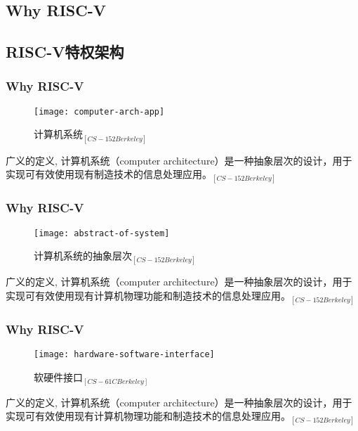 \subsection{Why RISC-V} %
\subsection{RISC-V特权架构}


\begin{frame}
	
	\frametitle{Why RISC-V}
	
	\begin{figure}
		\centering
		\texttt{[image: computer-arch-app]}
		\caption{计算机系统$_{[CS-152 Berkeley]}$}
	\end{figure}
	
	广义的定义, 计算机系统（computer architecture）是一种抽象层次的设计，用于实现可有效使用现有制造技术的信息处理应用。$_{[CS-152 Berkeley]}$
\end{frame}


\begin{frame}
	
	\frametitle{Why RISC-V}
	
	\begin{figure}
		\centering
		\texttt{[image: abstract-of-system]}
		\caption{计算机系统的抽象层次$ _{[CS-152 Berkeley]} $}
	\end{figure}
	
	广义的定义, 计算机系统（computer architecture）是一种抽象层次的设计，用于实现可有效使用现有计算机物理功能和制造技术的信息处理应用。$_{[CS-152 Berkeley]}$
	
\end{frame}


\begin{frame}[plain]
	
	\frametitle{Why RISC-V}
	\begin{figure}
		\centering
		\texttt{[image: hardware-software-interface]}
		\caption{软硬件接口$ _{[CS-61C Berkeley]} $}
	\end{figure}
	
	广义的定义, 计算机系统（computer architecture）是一种抽象层次的设计，用于实现可有效使用现有计算机物理功能和制造技术的信息处理应用。$_{[CS-152 Berkeley]}$
	
\end{frame}

